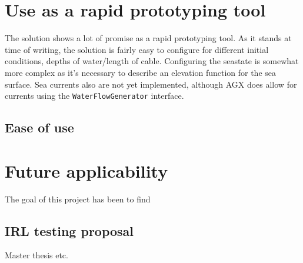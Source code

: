 \section{Use as a rapid prototyping tool}
The solution shows a lot of promise as a rapid prototyping tool. As it stands at time of writing, the solution is fairly easy to configure for different initial conditions, depths of water/length of cable. Configuring the seastate is somewhat more complex as it's necessary to describe an elevation function for the sea surface. Sea currents also are not yet implemented, although AGX does allow for currents using the \texttt{WaterFlowGenerator} interface. 


\subsection{Ease of use}

\section{Future applicability}
The goal of this project has been to find 
\subsection{IRL testing proposal}
Master thesis etc.